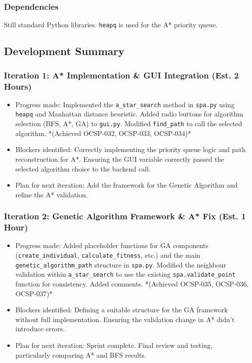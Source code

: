 \subsubsection{Dependencies}
Still standard Python libraries. \verb|heapq| is used for the A* priority queue.

\newpage
\subsection{Development Summary}

\subsubsection{Iteration 1: A* Implementation \& GUI Integration (Est. 2 Hours)}
\begin{itemize}
	\item Progress made: Implemented the \verb|a_star_search| method in \verb|spa.py| using \verb|heapq| and Manhattan distance heuristic. Added radio buttons for algorithm selection (BFS, A*, GA) to \verb|gui.py|. Modified \verb|find_path| to call the selected algorithm. *(Achieved OCSP-032, OCSP-033, OCSP-034)*
	\item Blockers identified: Correctly implementing the priority queue logic and path reconstruction for A*. Ensuring the GUI variable correctly passed the selected algorithm choice to the backend call.
	\item Plan for next iteration: Add the framework for the Genetic Algorithm and refine the A* validation.
\end{itemize}

\subsubsection{Iteration 2: Genetic Algorithm Framework \& A* Fix (Est. 1 Hour)}
\begin{itemize}
	\item Progress made: Added placeholder functions for GA components (\verb|create_individual|, \verb|calculate_fitness|, etc.) and the main \verb|genetic_algorithm_path| structure in \verb|spa.py|. Modified the neighbour validation within \verb|a_star_search| to use the existing \verb|spa.validate_point| function for consistency. Added comments. *(Achieved OCSP-035, OCSP-036, OCSP-037)*
	\item Blockers identified: Defining a suitable structure for the GA framework without full implementation. Ensuring the validation change in A* didn't introduce errors.
	\item Plan for next iteration: Sprint complete. Final review and testing, particularly comparing A* and BFS results.
\end{itemize}

